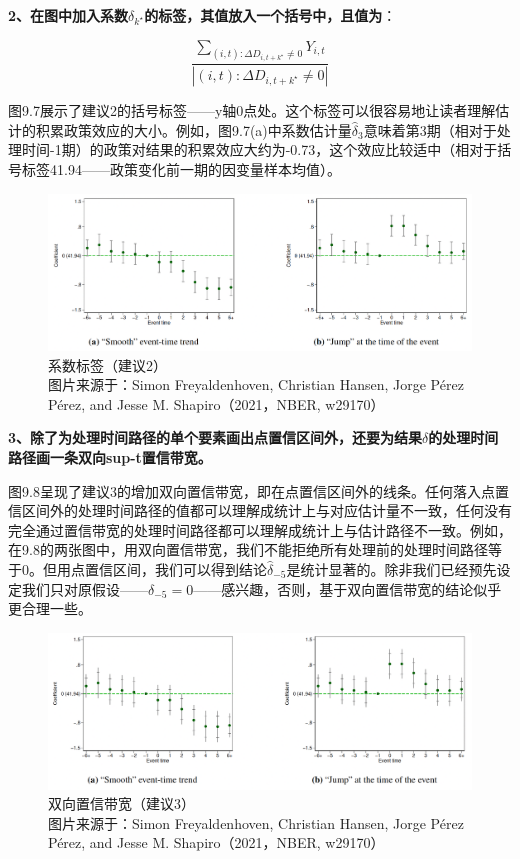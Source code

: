 \documentclass[cn,12pt,math=newtx,citestyle=gb7714-2015,bibstyle=gb7714-2015]{elegantbook}
\begin{document}
\textbf{2、在图中加入系数$\delta_{k^\star}$的标签，其值放入一个括号中，且值为}：

\begin{equation}
	\frac{\sum_{(i,t):\Delta D_{i,t+k^\star} \neq 0}Y_{i,t}}{|(i,t):\Delta D_{i,t+k^\star} \neq 0|}
\end{equation}
	
	图9.7展示了建议2的括号标签——y轴0点处。这个标签可以很容易地让读者理解估计的积累政策效应的大小。例如，图9.7(a)中系数估计量$\hat{\delta}_3$意味着第3期（相对于处理时间-1期）的政策对结果的积累效应大约为-0.73，这个效应比较适中（相对于括号标签41.94——政策变化前一期的因变量样本均值）。
	
	\begin{figure}[tbph]
		\centering
		\includegraphics[width=1\linewidth]{sug2}
		\caption{系数标签（建议2）\\ 图片来源于：Simon Freyaldenhoven, Christian Hansen, Jorge Pérez Pérez, and Jesse M. Shapiro（2021，NBER, w29170）}
		\label{fig:sug2}
	\end{figure}
	
	
	\textbf{3、除了为处理时间路径的单个要素画出点置信区间外，还要为结果$\delta$的处理时间路径画一条双向sup-t置信带宽。}
	
	图9.8呈现了建议3的增加双向置信带宽，即在点置信区间外的线条。任何落入点置信区间外的处理时间路径的值都可以理解成统计上与对应估计量不一致，任何没有完全通过置信带宽的处理时间路径都可以理解成统计上与估计路径不一致。例如，在9.8的两张图中，用双向置信带宽，我们不能拒绝所有处理前的处理时间路径等于0。但用点置信区间，我们可以得到结论$\hat{\delta}_{-5}$是统计显著的。除非我们已经预先设定我们只对原假设——$\delta_{-5}=0$——感兴趣，否则，基于双向置信带宽的结论似乎更合理一些。
	
	\begin{figure}[tbph]
		\centering
		\includegraphics[width=1\linewidth]{sug3}
		\caption{双向置信带宽（建议3）\\ 图片来源于：Simon Freyaldenhoven, Christian Hansen, Jorge Pérez Pérez, and Jesse M. Shapiro（2021，NBER, w29170）}
		\label{fig:sug3}
	\end{figure}
	
\end{document}
